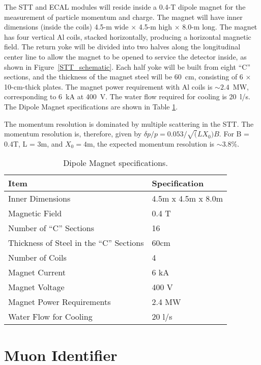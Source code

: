 The STT and ECAL modules will reside inside a 0.4-T dipole 
magnet for the measurement of particle momentum and charge. 
The magnet will have inner dimensions (inside the coils) 
4.5-m wide $\times$ 4.5-m high $\times$ 8.0-m long. The 
magnet 
has four vertical Al coils, stacked horizontally, producing a horizontal magnetic 
field. The return yoke will be divided into two halves along the 
longitudinal center line to allow the magnet to be opened to service the
detector inside, as shown in Figure~\ref{STT_schematic}. 
Each half yoke will be built
from eight ``C'' sections, and the thickness of the 
magnet steel will be 60~cm, consisting of 6
$\times$ 10-cm-thick plates. The magnet power requirement with Al coils is $\sim 2.4$~MW,
corresponding to 6~kA at 400~V. The water flow required for cooling is 20~l/s.
The Dipole Magnet specifications are shown in Table \ref{Magnet_specs}.

The momentum resolution is dominated by multiple scattering in the STT. The momentum resolution is, therefore, given by 
$\delta p/p = 0.053/\sqrt(LX_0)B$. For B = 0.4T, L = 3m, and $X_0 = 4$m, the
expected momentum resolution is $\sim 3.8\%$. 

\begin{table}
\centering
  \caption{\label{Magnet_specs} Dipole Magnet specifications.}
  \begin{tabular}{| l | l |}
    \hline
Item&Specification \\
    \hline
Inner Dimensions & 4.5m x 4.5m x 8.0m \\
Magnetic Field & 0.4 T \\
Number of ``C'' Sections & 16 \\
Thickness of Steel in the ``C'' Sections & 60cm \\
Number of Coils & 4 \\
Magnet Current & 6 kA \\
Magnet Voltage & 400 V \\
Magnet Power Requirements & 2.4 MW \\
Water Flow for Cooling & 20 l/s \\
     \hline
  \end{tabular}
\end{table}

\section{Muon Identifier}
\label{sec:muid}

